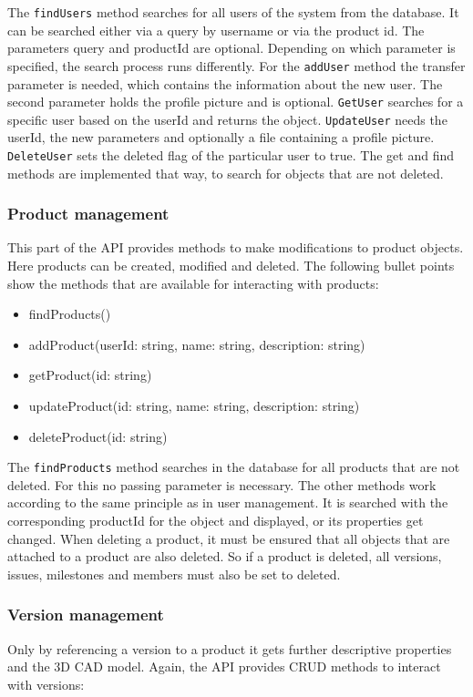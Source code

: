     The \texttt{findUsers} method searches for all users of the system from the database. It can be searched either via a query by username or via the product id. The parameters query and productId are optional. Depending on which parameter is specified, the search process runs differently. For the \texttt{addUser} method the transfer parameter is needed, which contains the information about the new user. The second parameter holds the profile picture and is optional. \texttt{GetUser} searches for a specific user based on the userId and returns the object. \texttt{UpdateUser} needs the userId, the new parameters and optionally a file containing a profile picture. \texttt{DeleteUser} sets the deleted flag of the particular user to true. The get and find methods are implemented that way, to search for objects that are not deleted.

    \subsubsection*{Product management}
    This part of the API provides methods to make modifications to product objects. Here products can be created, modified and deleted. The following bullet points show the methods that are available for interacting with products:

    \begin{itemize}
        \item findProducts()
        \item addProduct(userId: string, name: string, description: string)
        \item getProduct(id: string)
        \item updateProduct(id: string, name: string, description: string)
        \item deleteProduct(id: string)
    \end{itemize}

    The \texttt{findProducts} method searches in the database for all products that are not deleted. For this no passing parameter is necessary. The other methods work according to the same principle as in user management. It is searched with the corresponding productId for the object and displayed, or its properties get changed. When deleting a product, it must be ensured that all objects that are attached to a product are also deleted. So if a product is deleted, all versions, issues, milestones and members must also be set to deleted.

    \subsubsection*{Version management}
    Only by referencing a version to a product it gets further descriptive properties and the 3D CAD model. Again, the API provides CRUD methods to interact with versions:

